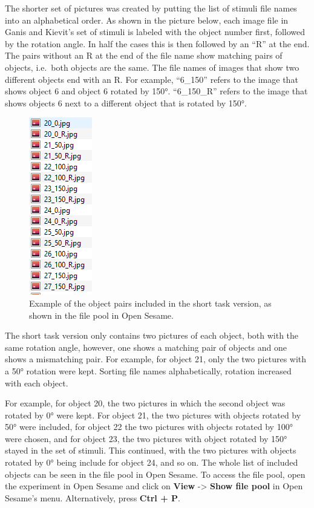 \documentclass[
]{book}
\begin{document}
The shorter set of pictures was created by putting the list of stimuli file names into an alphabetical order. As shown in the picture below, each image file in Ganis and Kievit's set of stimuli is labeled with the object number first, followed by the rotation angle. In half the cases this is then followed by an ``R'' at the end. The pairs without an R at the end of the file name show matching pairs of objects, i.e.~both objects are the same. The file names of images that show two different objects end with an R. For example, ``6\_150'' refers to the image that shows object 6 and object 6 rotated by 150°. ``6\_150\_R'' refers to the image that shows objects 6 next to a different object that is rotated by 150°.

\begin{figure}

{\centering \includegraphics[width=0.2\linewidth]{images/RotationNumberList} 

}

\caption{Example of the object pairs included in the short task version, as shown in the file pool in Open Sesame.}\label{fig:Figure5-3}
\end{figure}

The short task version only contains two pictures of each object, both with the same rotation angle, however, one shows a matching pair of objects and one shows a mismatching pair. For example, for object 21, only the two pictures with a 50° rotation were kept. Sorting file names alphabetically, rotation increased with each object.

For example, for object 20, the two pictures in which the second object was rotated by 0° were kept. For object 21, the two pictures with objects rotated by 50° were included, for object 22 the two pictures with objects rotated by 100° were chosen, and for object 23, the two pictures with object rotated by 150° stayed in the set of stimuli. This continued, with the two pictures with objects rotated by 0° being include for object 24, and so on. The whole list of included objects can be seen in the file pool in Open Sesame. To access the file pool, open the experiment in Open Sesame and click on \textbf{View} -\textgreater{} \textbf{Show file pool} in Open Sesame's menu. Alternatively, press \textbf{Ctrl + P}.
\end{document}
